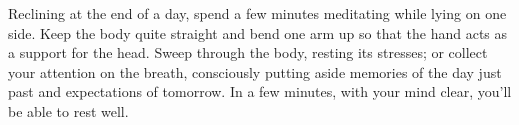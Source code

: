 
Reclining at the end of a day, spend a few minutes meditating while
lying on one side. Keep the body quite straight and bend one arm up so
that the hand acts as a support for the head. Sweep through the body,
resting its stresses; or collect your attention on the breath,
consciously putting aside memories of the day just past and expectations
of tomorrow. In a few minutes, with your mind clear, you'll be able to
rest well.
